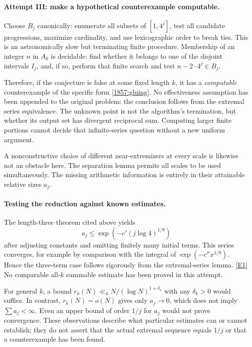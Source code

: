 \documentclass[11pt,a4paper]{article}
\newcommand{\eref}[2]{\hyperlink{extra:#1:#2}{[E#2]}}
\numberwithin{equation}{section}
\begin{document}
\paragraph{Attempt III: make a hypothetical counterexample computable.}
Choose $B_j$ canonically: enumerate all subsets of $[1,4^j]$, test
all candidate progressions, maximize cardinality, and use lexicographic
order to break ties.  This is an astronomically slow but terminating
finite procedure.  Membership of an integer $n$ in $A_k$ is decidable:
find whether it belongs to one of the disjoint intervals $I_j$, and,
if so, perform that finite search and test $n-2\cdot4^j\in B_j$.

Therefore, if the conjecture is false at some fixed length $k$, it
has a \emph{computable} counterexample of the specific form
\eqref{1857:gluing}.  No effectiveness assumption has been appended
to the original problem: the conclusion follows from the extremal
series equivalence.  The unknown point is not the algorithm's
termination, but whether its output set has divergent reciprocal sum.
Computing larger finite portions cannot decide that infinite-series
question without a new uniform argument.

A nonconstructive choice of different near-extremizers at every scale
is likewise not an obstacle here.  The separation lemma permits all
scales to be used simultaneously.  The missing arithmetic information
is entirely in their attainable relative sizes $a_j$.

\paragraph{Testing the reduction against known estimates.}
The length-three theorem cited above yields
\[
 a_j\leq\exp(-c'(j\log4)^{1/9})
\]
after adjusting constants and omitting finitely many initial terms.
This series converges, for example by comparison with the integral
of $\exp(-c''x^{1/9})$.  Hence the three-term case follows rigorously
from the extremal-series lemma. \eref{1857}{1}
No comparable all-$k$ summable estimate has been proved in this attempt.

For general $k$, a bound
$r_k(N)\ll_k N/(\log N)^{1+\delta_k}$ with any $\delta_k>0$ would
suffice.  In contrast, $r_k(N)=o(N)$ gives only $a_j\to0$, which does
not imply $\sum a_j<\infty$.  Even an upper bound of order $1/j$
for $a_j$ would not prove convergence.  These observations describe
what particular estimates can or cannot establish; they do not assert
that the actual extremal sequence equals $1/j$ or that a counterexample
has been found.
\end{document}
